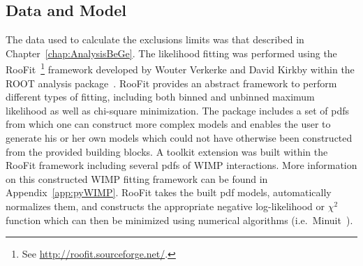 	\subsection{Data and Model}
	\label{sec:LimitsDataAndModel}	

The data used to calculate the exclusions limits was that described in Chapter~\ref{chap:AnalysisBeGe}.  The likelihood fitting was performed using the RooFit~\footnote{See \url{http://roofit.sourceforge.net/}.} framework developed by Wouter Verkerke and David Kirkby within the ROOT analysis package~\cite{Bru97}.  RooFit provides an abstract framework to perform different types of fitting, including both binned and unbinned maximum likelihood as well as chi-square minimization.  The package includes a set of pdfs from which one can construct more complex models and enables the user to generate his or her own models which could not have otherwise been constructed from the provided building blocks.  A toolkit extension was built within the RooFit framework including several pdfs of WIMP interactions.  More information on this constructed WIMP fitting framework can be found in Appendix~\ref{app:pyWIMP}.  RooFit takes the built pdf models, automatically normalizes them, and constructs the appropriate negative log-likelihood or $\chi^{2}$ function which can then be minimized using numerical algorithms (i.e.~Minuit~\cite{James:1975dr}).

